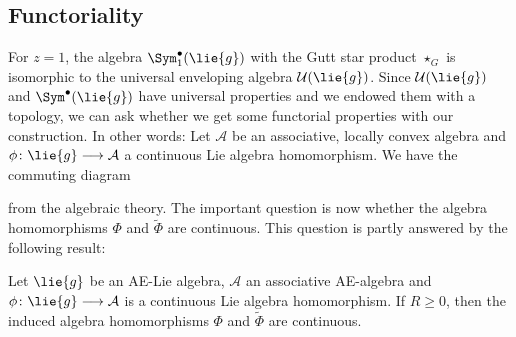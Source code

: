 \subsection*{Functoriality}

For $z = 1$, the algebra $\Sym_1^{\bullet}(\lie{g})$ with the 
Gutt star product $\star_G$ is isomorphic to the universal enveloping 
algebra $\mathcal{U}(\lie{g})$. Since $\mathcal{U}(\lie{g})$ and 
$\Sym^{\bullet}(\lie{g})$ have universal properties and we 
endowed them with a topology, we can ask whether we get some functorial
properties with our construction. In other words: Let $\mathcal{A}$ be
an associative, locally convex algebra and $\phi \colon \lie{g}
\longrightarrow \mathcal{A}$ a continuous Lie algebra homomorphism. We
have the commuting diagram
\begin{center}
\end{center}
from the algebraic theory. The important question is now whether the
algebra homomorphisms $\Phi$ and $\widetilde{\Phi}$ are continuous. This 
question is partly answered by the following result:
\begin{proposition}
    \label{Thm:LCAna:Semi-functoriality}%
    Let $\lie{g}$ be an AE-Lie algebra, $\mathcal{A}$ an associative
    AE-algebra and $\phi \colon \lie{g} \longrightarrow \mathcal{A}$
    is a continuous Lie algebra homomorphism.  If $R \geq 0$, then the
    induced algebra homomorphisms $\Phi$ and $\widetilde{\Phi}$ are
    continuous.
\end{proposition}
